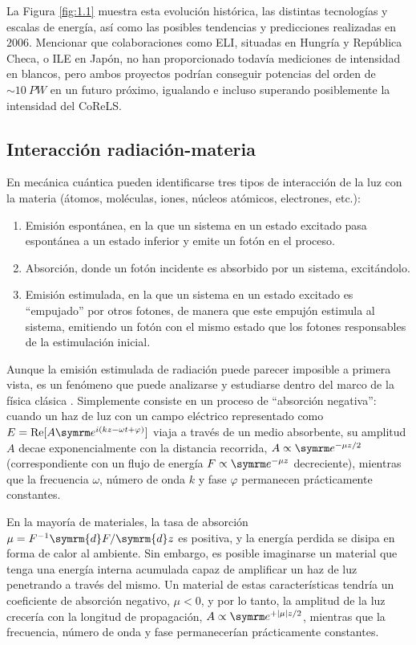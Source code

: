 La Figura \ref{fig:1.1} muestra esta evolución histórica, las distintas tecnologías y escalas de energía, así como las posibles tendencias y predicciones \autocite{Mourou2006} realizadas en $2006$. Mencionar que colaboraciones como ELI, situadas en Hungría y República Checa, o ILE en Japón, no han proporcionado todavía mediciones de intensidad en blancos, pero ambos proyectos podrían conseguir potencias del orden de $\sim \qty{10}{PW}$ en un futuro próximo, igualando e incluso superando posiblemente la intensidad del CoReLS. 

\subsection{Interacción radiación-materia}\label{sec:1.1.1}
En mecánica cuántica pueden identificarse tres tipos de interacción de la luz con la materia (átomos, moléculas, iones, núcleos atómicos, electrones, etc.): 
\begin{enumerate}[label=(\roman*)]

    \item Emisión espontánea, en la que un sistema en un estado excitado pasa espontánea a un estado inferior y emite un fotón en el proceso.
    \item Absorción, donde un fotón incidente es absorbido por un sistema, excitándolo.
    \item Emisión estimulada, en la que un sistema en un estado excitado es \enquote{empujado} por otros fotones, de manera que este empujón estimula al sistema, emitiendo un fotón con el mismo estado que los fotones responsables de la estimulación inicial.

\end{enumerate}
Aunque la emisión estimulada de radiación puede parecer imposible a primera vista, es un fenómeno que puede analizarse y estudiarse dentro del marco de la física clásica \autocite{Thorne2017}. Simplemente consiste en un proceso de \enquote{absorción negativa}: cuando un haz de luz con un campo eléctrico representado como $E = \RE [A\eu^{i(kz - \omega t + \varphi)}]$ viaja a través de un medio absorbente, su amplitud $A$ decae exponencialmente con la distancia recorrida, $A \propto \eu^{-\mu z/2}$ (correspondiente con un flujo de energía $F \propto \eu^{-\mu z}$ decreciente), mientras que la frecuencia $\omega$, número de onda $k$ y fase $\varphi$ permanecen prácticamente constantes.

En la mayoría de materiales, la tasa de absorción $\mu = F^{-1} \symrm{d}F/\symrm{d}z$ es positiva, y la energía perdida se disipa en forma de calor al ambiente. Sin embargo, es posible imaginarse un material que tenga una energía interna acumulada capaz de amplificar un haz de luz penetrando a través del mismo. Un material de estas características tendría un coeficiente de absorción negativo, $\mu < 0$, y por lo tanto, la amplitud de la luz crecería con la longitud de propagación, $A \propto \eu^{+|\mu|z/2}$, mientras que la frecuencia, número de onda y fase permanecerían prácticamente constantes.

